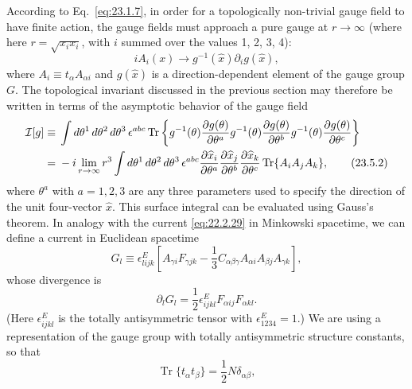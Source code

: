 According to Eq.~\eqref{eq:23.1.7}, in order for a topologically
non-trivial gauge field to have finite action, the gauge fields must
approach a pure gauge at $r\to\infty$ (where here
$r=\sqrt{x_ix_i}$, with $i$ summed over the values 1, 2, 3, 4):
\begin{equation}
iA_i(x)\longrightarrow g^{-1}(\widehat x)\partial_i g(\widehat x),
\tag{23.5.1}\label{eq:23.5.1}
\end{equation}
where $A_i\equiv t_\alpha A_{\alpha i}$ and $g(\widehat x)$ is a
direction-dependent element of the gauge group $G$. The topological
invariant discussed in the previous section may therefore be written in
terms of the asymptotic behavior of the gauge field
\begin{align}
\mathcal I[g]\equiv{}&
\int d\theta^1\,d\theta^2\,d\theta^3\,\epsilon^{abc}
\operatorname{Tr}\left\{
g^{-1}(\theta)\frac{\partial g(\theta)}{\partial\theta^a}
g^{-1}(\theta)\frac{\partial g(\theta)}{\partial\theta^b}
g^{-1}(\theta)\frac{\partial g(\theta)}{\partial\theta^c}
\right\}
\notag\\
={}&-i\lim_{r\to\infty}r^3
\int d\theta^1\,d\theta^2\,d\theta^3\,\epsilon^{abc}
\frac{\partial\widehat x_i}{\partial\theta^a}
\frac{\partial\widehat x_j}{\partial\theta^b}
\frac{\partial\widehat x_k}{\partial\theta^c}
\operatorname{Tr}\{A_iA_jA_k\},
\tag{23.5.2}\label{eq:23.5.2}
\end{align}
where $\theta^a$ with $a=1,2,3$ are any three parameters used to specify
the direction of the unit four-vector $\widehat x$. This surface integral
can be evaluated using Gauss's theorem. In analogy with the current
\eqref{eq:22.2.29} in Minkowski spacetime, we can define a current in
Euclidean spacetime
\begin{equation}
G_l\equiv\epsilon^E_{lijk}\left[
A_{\gamma i}F_{\gamma jk}
-\frac13C_{\alpha\beta\gamma}
A_{\alpha i}A_{\beta j}A_{\gamma k}
\right],
\tag{23.5.3}\label{eq:23.5.3}
\end{equation}
whose divergence is
\begin{equation}
\partial_lG_l=\frac12\epsilon^E_{ijkl}F_{\alpha ij}F_{\alpha kl}.
\tag{23.5.4}\label{eq:23.5.4}
\end{equation}
(Here $\epsilon^E_{ijkl}$ is the totally antisymmetric tensor with
$\epsilon^E_{1234}=1$.) We are using a representation of the gauge group
with totally antisymmetric structure constants, so that
\begin{equation}
\operatorname{Tr}\{t_\alpha t_\beta\}=\frac12N\delta_{\alpha\beta},
\tag{23.5.5}\label{eq:23.5.5}
\end{equation}
